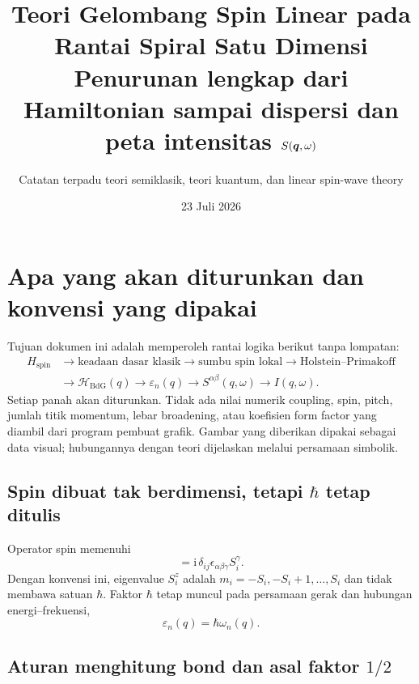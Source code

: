 \documentclass[11pt,a4paper]{article}
\title{\textbf{Teori Gelombang Spin Linear pada Rantai Spiral Satu Dimensi}\\[0.35em]
\large Penurunan lengkap dari Hamiltonian sampai dispersi dan peta intensitas $S(\bm q,\omega)$}
\author{Catatan terpadu teori semiklasik, teori kuantum, dan linear spin-wave theory}
\date{23 Juli 2026}
\newcommand{\ii}{\mathrm{i}}
\newcommand{\mH}{\mathcal H}
\begin{document}
\maketitle

\section{Apa yang akan diturunkan dan konvensi yang dipakai}

Tujuan dokumen ini adalah memperoleh rantai logika berikut tanpa lompatan:
\begin{equation}
\begin{aligned}
H_{\mathrm{spin}}
&\longrightarrow
\text{keadaan dasar klasik}
\longrightarrow
\text{sumbu spin lokal}
\longrightarrow
\text{Holstein--Primakoff}\\
&\longrightarrow
\mH_{\mathrm{BdG}}(q)
\longrightarrow
\varepsilon_n(q)
\longrightarrow
S^{\alpha\beta}(q,\omega)
\longrightarrow
I(q,\omega).
\end{aligned}
\label{eq:master-chain}
\end{equation}
Setiap panah akan diturunkan. Tidak ada nilai numerik coupling, spin, pitch, jumlah titik momentum, lebar broadening, atau koefisien form factor yang diambil dari program pembuat grafik. Gambar yang diberikan dipakai sebagai data visual; hubungannya dengan teori dijelaskan melalui persamaan simbolik.

\subsection{Spin dibuat tak berdimensi, tetapi \texorpdfstring{$\hbar$}{hbar} tetap ditulis}

Operator spin memenuhi
\begin{equation}
[S_i^\alpha,S_j^\beta]
=\ii\,\delta_{ij}\epsilon_{\alpha\beta\gamma}S_i^\gamma.
\label{eq:spin-commutator}
\end{equation}
Dengan konvensi ini, eigenvalue $S_i^z$ adalah $m_i=-S_i,-S_i+1,\ldots,S_i$ dan tidak membawa satuan $\hbar$. Faktor $\hbar$ tetap muncul pada persamaan gerak dan hubungan energi--frekuensi,
\begin{equation}
\varepsilon_n(q)=\hbar\omega_n(q).
\end{equation}

\subsection{Aturan menghitung bond dan asal faktor \texorpdfstring{$1/2$}{1/2}}
\end{document}
